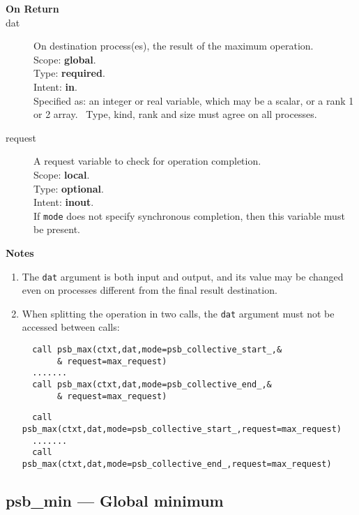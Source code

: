 \begin{description}
\item[\bf On Return]
\item[dat] On destination process(es), the result of the maximum operation.\\
Scope: {\bf global}.\\
Type: {\bf required}.\\
Intent: {\bf in}.\\
Specified as: an integer or  real variable, which may be a
scalar, or a rank 1 or 2 array. \
Type, kind, rank and size must agree on all processes.
\item[request] A request variable to check for operation completion.\\
Scope: {\bf local}.\\
Type: {\bf optional}.\\
Intent: {\bf inout}.\\
If \verb|mode| does not specify synchronous completion, then this
variable must be present.
\end{description}


{\par\noindent\large\bfseries Notes}
\begin{enumerate}
\item The \verb|dat| argument is both input and output, and its
  value may be changed even on processes different from the final
  result destination.
\item When splitting the operation in two calls, the \verb|dat|
  argument  must not be accessed between calls:
\ifpdf
\begin{verbatim}
  call psb_max(ctxt,dat,mode=psb_collective_start_,&
       & request=max_request)
  .......
  call psb_max(ctxt,dat,mode=psb_collective_end_,&
       & request=max_request)
\end{verbatim}
\else
\begin{center}
    \begin{minipage}[tl]{0.9\textwidth}
\begin{verbatim} 
  call psb_max(ctxt,dat,mode=psb_collective_start_,request=max_request)
  .......
  call psb_max(ctxt,dat,mode=psb_collective_end_,request=max_request)
\end{verbatim}
    \end{minipage}
  \end{center}
\fi
\end{enumerate}

\clearpage\subsection{psb\_min --- Global minimum}

